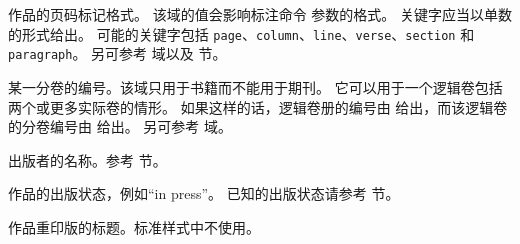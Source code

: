 \begin{fieldlist}
作品的页码标记格式。
该域的值会影响标注命令  参数的格式。
关键字应当以单数的形式给出。
可能的关键字包括 \texttt{page}、\texttt{column}、\texttt{line}、\texttt{verse}、\texttt{section} 和 \texttt{paragraph}。
另可参考  域以及  节。




某一分卷的编号。该域只用于书籍而不能用于期刊。
它可以用于一个逻辑卷包括两个或更多实际卷的情形。
如果这样的话，逻辑卷册的编号由  给出，而该逻辑卷的分卷编号由  给出。
另可参考  域。




出版者的名称。参考  节。




作品的出版状态，例如“in press”。
已知的出版状态请参考   节。




作品重印版的标题。标准样式中不使用。




\end{fieldlist}
